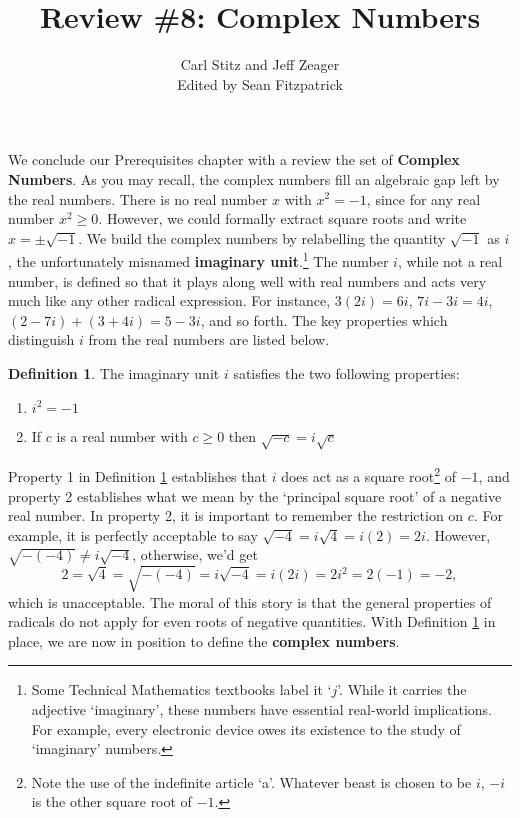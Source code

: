 \documentclass[11pt]{article}
\title{Review \#8: Complex Numbers}
\author{Carl Stitz and Jeff Zeager\\
Edited by Sean Fitzpatrick}
\theoremstyle{definition}  %
\newtheorem{defn}{\bf Definition}
\newcommand{\bbm}{\begin{boxedminipage}{6.41in}}
\newcommand{\ebm}{\end{boxedminipage}}
\begin{document}
\maketitle


\renewcommand{\headrulewidth}{0pt}
\renewcommand{\headheight}{14pt}
\lhead[\fancyplain{}{\sc\thepage}]%
      {\fancyplain{}{\sc \nouppercase{\rightmark}}}
\rhead[\fancyplain{}{\sc \nouppercase{\leftmark}}]%
      {\fancyplain{}{\sc\thepage}}
\cfoot{}



We conclude our Prerequisites chapter with a review the set of \textbf{Complex Numbers}.  As you may recall, the complex numbers fill an algebraic gap left by the real numbers.  There is no real number $x$ with $x^2 = -1$, since for any real number $x^2 \geq 0$.  However, we could formally extract square roots and write $x = \pm \sqrt{-1}$.  We build the complex numbers by relabelling the quantity $\sqrt{-1}$ as $i$, the unfortunately misnamed \textbf{imaginary unit}.\footnote{Some Technical Mathematics textbooks label it `$j$'.  While it carries the adjective `imaginary', these numbers have essential real-world implications.  For example, every electronic device owes its existence to the study of `imaginary' numbers.}  The number $i$, while not a real number, is defined so that it plays along well with real numbers and acts very much like any other radical expression.  For instance, $3(2i) = 6i$, $7i-3i = 4i$, $(2-7i) + (3 + 4i) = 5-3i$, and so forth.  The key properties which distinguish $i$ from the real numbers are listed below.

\medskip

\colorbox{ResultColor}{\bbm
\begin{defn} \label{idefn} The imaginary unit $i$ satisfies the two following properties:

\begin{enumerate}

\item  $i^2 = -1$

\item  If $c$ is a real number with $c \geq 0$ then $\sqrt{-c} = i \sqrt{c}$

\end{enumerate}

\end{defn}
\ebm}

\medskip

Property 1 in Definition \ref{idefn} establishes that $i$ does act as a square root\footnote{Note the use of the indefinite article `a'.  Whatever beast is chosen to be $i$, $-i$ is the other square root of $-1$.} of $-1$, and property 2 establishes what we mean by the `principal square root' of a negative real number.  In property 2, it is important to remember the restriction on $c$.  For example, it is perfectly acceptable to say  $\sqrt{-4} = i \sqrt{4} = i(2) = 2i$. However, $\sqrt{-(-4)} \neq i \sqrt{-4}$, otherwise, we'd get\[ 2 = \sqrt{4} = \sqrt{-(-4)} = i \sqrt{-4} = i (2i) = 2i^2 = 2(-1) = -2,\] which is unacceptable. The moral of this story is that the general properties of radicals do not apply for even roots of negative quantities.  With Definition \ref{idefn} in place, we are now in position to define the \textbf{complex numbers}.
\end{document}
